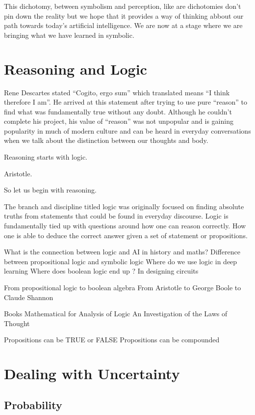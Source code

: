 \documentclass[]{book}
\theoremstyle{definition}
\theoremstyle{definition}
\theoremstyle{definition}
\theoremstyle{remark}
\begin{document}
This dichotomy, between symbolism and perception, like are dichotomies
don't pin down the reality but we hope that it provides a way of
thinking abbout our path towards today's artificial intelligence. We are
now at a stage where we are bringing what we have learned in symbolic.

\section{Reasoning and Logic}\label{reasoning-and-logic}

Rene Descartes stated ``Cogito, ergo sum'' which translated means ``I
think therefore I am''. He arrived at this statement after trying to use
pure ``reason'' to find what was fundamentally true without any doubt.
Although he couldn't complete his project, his value of ``reason'' was
not unpopular and is gaining popularity in much of modern culture and
can be heard in everyday conversations when we talk about the
distinction between our thoughts and body.

Reasoning starts with logic.

Aristotle.

So let us begin with reasoning.

The branch and discipline titled logic was originally focused on finding
absolute truths from statements that could be found in everyday
discourse. Logic is fundamentally tied up with questions around how one
can reason correctly. How one is able to deduce the correct answer given
a set of statement or propositions.

What is the connection between logic and AI in history and maths?
Difference between propositional logic and symbolic logic Where do we
use logic in deep learning Where does boolean logic end up ? In
designing circuits

From propositional logic to boolean algebra From Aristotle to George
Boole to Claude Shannon

Books Mathematical for Analysis of Logic An Investigation of the Laws of
Thought

Propositions can be TRUE or FALSE Propositions can be compounded

\section{Dealing with Uncertainty}\label{dealing-with-uncertainty}

\subsection{Probability}\label{probability}
\end{document}
